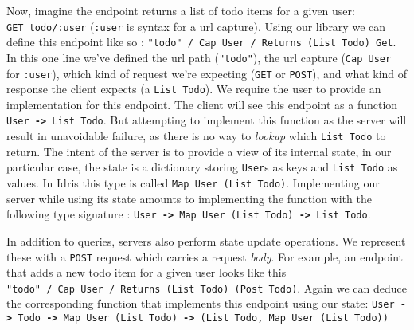 \documentclass[sigplan,screen,review, nonacm]{acmart}
\newcommand{\DataTypeTok}[1]{\textcolor[rgb]{0.56,0.13,0.00}{#1}}
\newcommand{\KeywordTok}[1]{\textcolor[rgb]{0.00,0.44,0.13}{\textbf{#1}}}
\newcommand{\OperatorTok}[1]{\textcolor[rgb]{0.40,0.40,0.40}{#1}}
\newcommand{\OtherTok}[1]{\textcolor[rgb]{0.00,0.44,0.13}{#1}}
\newcommand{\StringTok}[1]{\textcolor[rgb]{0.25,0.44,0.63}{#1}}
\begin{document}
Now, imagine the endpoint returns a list of todo
items for a given user: \texttt{GET\ todo/:user} (\texttt{:user} is syntax for a url capture).
Using our library we can define this
endpoint like so :
\texttt{\StringTok{"todo"}\ \OperatorTok{/}\ \OtherTok{Cap}\ \DataTypeTok{User}\ \OperatorTok{/}\
\OtherTok{Returns}\ (\OtherTok{List}\ \DataTypeTok{Todo})\ \DataTypeTok{Get}}. In this
one line we've defined the url path (\texttt{\StringTok{"todo"}}),
the url capture (\texttt{\OtherTok{Cap}\ \DataTypeTok{User}} for \texttt{:user}),
which kind of request we're expecting (\texttt{GET} or \texttt{POST}), and what kind of
response the client expects (a \texttt{\OtherTok{List}\ \DataTypeTok{Todo}}). We require the
user to provide an implementation for this endpoint. The client will see this endpoint as a function
\texttt{\DataTypeTok{User}\ \KeywordTok{-\textgreater{}}\ \OtherTok{List}\ \DataTypeTok{Todo}}.
But attempting to implement
this function as the server will result in unavoidable failure, as there is no way to
\emph{lookup} which \texttt{\OtherTok{List}\ \DataTypeTok{Todo}} to return.
The intent of the server is to provide a view of its internal state, in our particular case, the state
is a dictionary storing \texttt{\DataTypeTok{User}}s as keys
and \texttt{\OtherTok{List}\ \DataTypeTok{Todo}} as values. In Idris this type is called
\texttt{\OtherTok{Map}\ \DataTypeTok{User}\ (\OtherTok{List}\ \DataTypeTok{Todo})}.
Implementing our server while using its state amounts to implementing the function with the
following type signature : \texttt{\DataTypeTok{User}\ \KeywordTok{-\textgreater{}}\ \OtherTok{Map}\ \DataTypeTok{User}\ (\OtherTok{List}\ \DataTypeTok{Todo})\ \KeywordTok{-\textgreater{}}\ \OtherTok{List}\ \DataTypeTok{Todo}}.

In addition to queries, servers also perform state update operations. We
represent these with a \texttt{POST} request which carries a request
\emph{body}. For example, an endpoint that adds a new todo item
for a given user looks like this
\texttt{\StringTok{"todo"}\ \OperatorTok{/}\ \OtherTok{Cap}\ \DataTypeTok{User}\ \OperatorTok{/}\ \OtherTok{Returns}\ (\OtherTok{List}\ \DataTypeTok{Todo})\ (\OtherTok{Post}\ \DataTypeTok{Todo})}.
Again we can deduce the corresponding function that implements this
endpoint using our state:
\texttt{\DataTypeTok{User}\ \KeywordTok{-\textgreater{}}\ \DataTypeTok{Todo}\ \KeywordTok{-\textgreater{}}\ \OtherTok{Map}\ \DataTypeTok{User}\ (\OtherTok{List}\ \DataTypeTok{Todo})\ \KeywordTok{-\textgreater{}}\ (\OtherTok{List}\ \DataTypeTok{Todo},\ \OtherTok{Map}\ \DataTypeTok{User}\ (\OtherTok{List}\ \DataTypeTok{Todo}))}
\end{document}
